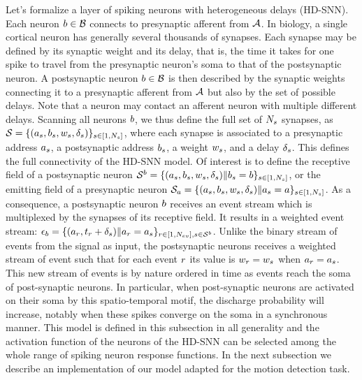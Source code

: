 \documentclass[default]{sn-jnl}%
\theoremstyle{thmstyleone}%
\theoremstyle{thmstyletwo}%
\theoremstyle{thmstylethree}%
\begin{document}
Let's formalize a layer of spiking neurons with heterogeneous delays (HD-SNN). Each neuron $b \in \mathcal{B}$ connects to presynaptic afferent from $\mathcal{A}$. In biology, a single cortical neuron has generally several thousands of synapses. Each synapse may be defined by its synaptic weight and its delay, that is, the time it takes for one spike to travel from the presynaptic neuron's soma to that of the postsynaptic neuron. A postsynaptic neuron $b \in \mathcal{B}$ is then described by the synaptic weights connecting it to a presynaptic afferent from $\mathcal{A}$ but also by the set of possible delays. Note that a neuron may contact an afferent neuron with multiple different delays. Scanning all neurons $b$, we thus define the full set of $N_{s}$ synapses, 
as  $\mathcal{S} = \{(a_s, b_s, w_s, \delta_s)\}_{s \in [1,N_{s}]}$, where each synapse is associated to a presynaptic address $a_s$, a postsynaptic address $b_s$, a weight $w_s$, and a delay $\delta_s$. This defines the full connectivity of the HD-SNN model. Of interest is to define the receptive field of a postsynaptic neuron $\mathcal{S}^b =  \{(a_s, b_s, w_s, \delta_s) \| b_s=b\}_{s \in [1,N_{s}]} $, or the emitting field of a presynaptic neuron $\mathcal{S}_a =  \{(a_s, b_s, w_s, \delta_s) \| a_s=a\}_{s \in [1,N_{s}]}$. As a consequence, a postsynaptic neuron $b$ receives an event stream which is multiplexed by the synapses of its receptive field. It results in a weighted event stream: 
$\epsilon_b = \{(a_r, t_r+\delta_s) \| a_r = a_s \}_{r \in [1,N_{ev}], s \in \mathcal{S}^b}$. Unlike the binary stream of events from the signal as input, the postsynaptic neurons receives a weighted stream of event such that for each event $r$ its value is $w_r = w_s$ when $a_r = a_s$. This new stream of events is by nature ordered in time as events reach the soma of post-synaptic neurons. In particular, when post-synaptic neurons are activated on their soma by this spatio-temporal motif, the discharge probability will increase, notably when these spikes converge on the soma in a synchronous manner. This model is defined in this subsection in all generality and the activation function of the neurons of the HD-SNN can be selected among the whole range of spiking neuron response functions. In the next subsection we describe an implementation of our model adapted for the motion detection task. 
\end{document}
